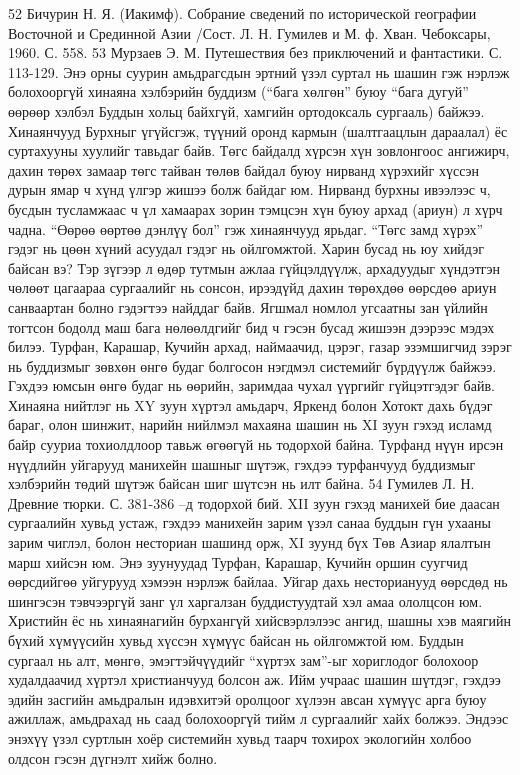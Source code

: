 52 Бичурин Н. Я. (Иакимф). Собрание сведений по исторической географии Восточной и Срединной Азии /Сост. Л. Н. Гумилев и М. ф. Хван. Чебоксары, 1960. С. 558. 53 Мурзаев Э. М. Путешествия без приключений и фантастики. С. 113-129.
Энэ орны суурин амьдрагсдын эртний үзэл суртал нь шашин гэж нэрлэж болохооргүй хинаяна хэлбэрийн буддизм (“бага хөлгөн” буюу “бага дугуй” өөрөөр хэлбэл Буддын хольц байхгүй, хамгийн ортодоксаль сургааль) байжээ. Хинаянчууд Бурхныг үгүйсгэж, түүний оронд кармын (шалтгаацлын дараалал) ёс суртахууны хуулийг тавьдаг байв. Төгс байдалд хүрсэн хүн зовлонгоос ангижирч, дахин төрөх замаар төгс тайван төлөв байдал буюу нирванд хүрэхийг хүссэн дурын ямар ч хүнд үлгэр жишээ болж байдаг юм. Нирванд бурхны ивээлээс ч, бусдын тусламжаас ч үл хамаарах зорин тэмцсэн хүн буюу архад (ариун) л хүрч чадна. “Өөрөө өөртөө дэнлүү бол” гэж хинаянчууд ярьдаг.
“Төгс замд хүрэх” гэдэг нь цөөн хүний асуудал гэдэг нь ойлгомжтой. Харин бусад нь юу хийдэг байсан вэ? Тэр зүгээр л өдөр тутмын ажлаа гүйцэлдүүлж, архадуудыг хүндэтгэн чөлөөт цагаараа сургаалийг нь сонсон, ирээдүйд дахин төрөхдөө өөрсдөө ариун санваартан болно гэдэгтээ найддаг байв. Ягшмал номлол угсаатны зан үйлийн тогтсон бодолд маш бага нөлөөлдгийг бид ч гэсэн бусад жишээн дээрээс мэдэх билээ. Турфан, Карашар, Кучийн архад, наймаачид, цэрэг, газар эзэмшигчид зэрэг нь буддизмыг зөвхөн өнгө будаг болгосон нэгдмэл системийг бүрдүүлж байжээ.
Гэхдээ юмсын өнгө будаг нь өөрийн, заримдаа чухал үүргийг гүйцэтгэдэг байв. Хинаяна нийтлэг нь XY зуун хүртэл амьдарч, Яркенд болон Хотокт дахь бүдэг бараг, олон шинжит, нарийн нийлмэл махаяна шашин нь XI зуун гэхэд исламд байр сууриа тохиолдлоор тавьж өгөөгүй нь тодорхой байна.
Турфанд нүүн ирсэн нүүдлийн уйгарууд манихейн шашныг шүтэж, гэхдээ турфанчууд буддизмыг хэлбэрийн төдий шүтэж байсан шиг шүтсэн нь илт байна.
54 Гумилев Л. Н. Древние тюрки. С. 381-386 –д тодорхой бий.
XII зуун гэхэд манихей бие даасан сургаалийн хувьд устаж, гэхдээ манихейн зарим үзэл санаа буддын гүн ухааны зарим чиглэл, болон несториан шашинд орж, XI зуунд бүх Төв Азиар ялалтын марш хийсэн юм. Энэ зуунуудад Турфан, Карашар, Кучийн оршин суугчид өөрсдийгөө уйгурууд хэмээн нэрлэж байлаа.
Уйгар дахь несторианууд өөрсдөд нь шингэсэн тэвчээргүй занг үл харгалзан буддистуудтай хэл амаа ололцсон юм. Христийн ёс нь хинаянагийн бурхангүй хийсвэрлэлээс ангид, шашны хэв маягийн бүхий хүмүүсийн хувьд хүссэн хүмүүс байсан нь ойлгомжтой юм. Буддын сургаал нь алт, мөнгө, эмэгтэйчүүдийг “хүртэх зам”-ыг хориглодог болохоор худалдаачид хүртэл христианчууд болсон аж. Ийм учраас шашин шүтдэг, гэхдээ эдийн засгийн амьдралын идэвхитэй оролцоог хүлээн авсан хүмүүс арга буюу ажиллаж, амьдрахад нь саад болохооргүй тийм л сургаалийг хайх болжээ. Эндээс энэхүү үзэл суртлын хоёр системийн хувьд таарч тохирох экологийн холбоо олдсон гэсэн дүгнэлт хийж болно.
